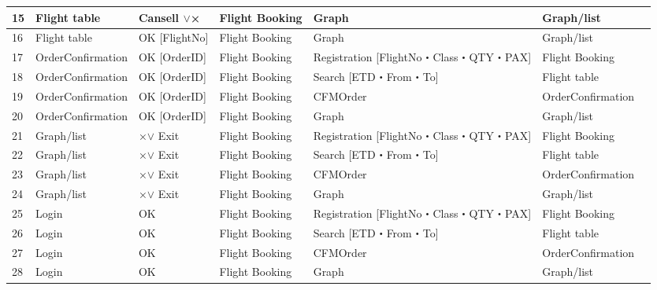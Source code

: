 \begin{table}[t]
\begin{tabular}{p{1 em}|p{5 em}|p{9.5 em}|p{5 em}|p{9.5 em}|p{5 em}|p{2 em}}
\hline
    15    & Flight table & Cansell $\lor$× & Flight Booking  & Graph & Graph/list &  \\
\hline
    16    & Flight table & OK [FlightNo] & Flight Booking  & Graph & Graph/list &  \\
\hline
    17    & OrderConfirmation & OK [OrderID] & Flight Booking  & Registration [FlightNo・Class・QTY・PAX] & Flight Booking  &  \\
\hline
    18    & OrderConfirmation & OK [OrderID] & Flight Booking  & Search [ETD・From・To] & Flight table &  \\
\hline
    19    & OrderConfirmation & OK [OrderID] & Flight Booking  & CFMOrder & OrderConfirmation &  \\
\hline
    20    & OrderConfirmation & OK [OrderID] & Flight Booking  & Graph & Graph/list &  \\
\hline
    21    & Graph/list & ×$\lor$ Exit & Flight Booking  & Registration [FlightNo・Class・QTY・PAX] & Flight Booking  &  \\
\hline
    22    & Graph/list & ×$\lor$ Exit & Flight Booking  & Search [ETD・From・To] & Flight table &  \\
\hline
    23    & Graph/list & ×$\lor$ Exit & Flight Booking  & CFMOrder & OrderConfirmation &  \\
\hline
    24    & Graph/list & ×$\lor$ Exit & Flight Booking  & Graph & Graph/list &  \\
\hline
    25    & Login & OK    & Flight Booking  & Registration [FlightNo・Class・QTY・PAX] & Flight Booking  &  \\
\hline
    26    & Login & OK    & Flight Booking  & Search [ETD・From・To] & Flight table &  \\
\hline
    27    & Login & OK    & Flight Booking  & CFMOrder & OrderConfirmation &  \\
\hline
    28    & Login & OK    & Flight Booking  & Graph & Graph/list &  \\
\hline

    \end{tabular}%
  \label{tab:STDS1}%
\end{table}%
